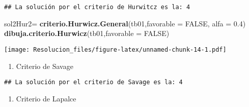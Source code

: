 \documentclass[
]{article}
\newenvironment{Shaded}{\begin{snugshade}}{\end{snugshade}}
\newcommand{\AttributeTok}[1]{\textcolor[rgb]{0.13,0.29,0.53}{#1}}
\newcommand{\ConstantTok}[1]{\textcolor[rgb]{0.56,0.35,0.01}{#1}}
\newcommand{\FloatTok}[1]{\textcolor[rgb]{0.00,0.00,0.81}{#1}}
\newcommand{\FunctionTok}[1]{\textcolor[rgb]{0.13,0.29,0.53}{\textbf{#1}}}
\newcommand{\NormalTok}[1]{#1}
\newcommand{\OtherTok}[1]{\textcolor[rgb]{0.56,0.35,0.01}{#1}}
\newcommand{\SpecialCharTok}[1]{\textcolor[rgb]{0.81,0.36,0.00}{\textbf{#1}}}
\newcommand{\StringTok}[1]{\textcolor[rgb]{0.31,0.60,0.02}{#1}}
\providecommand{\tightlist}{%
  \setlength{\itemsep}{0pt}\setlength{\parskip}{0pt}}
\begin{document}
\begin{verbatim}
## La solución por el criterio de Hurwitcz es la: 4
\end{verbatim}

\begin{Shaded}
\begin{Highlighting}[]
\NormalTok{sol2Hur2}\OtherTok{=} \FunctionTok{criterio.Hurwicz.General}\NormalTok{(tb01,}\AttributeTok{favorable =} \ConstantTok{FALSE}\NormalTok{, }\AttributeTok{alfa =} \FloatTok{0.4}\NormalTok{)}
\FunctionTok{dibuja.criterio.Hurwicz}\NormalTok{(tb01,}\AttributeTok{favorable =} \ConstantTok{FALSE}\NormalTok{)}
\end{Highlighting}
\end{Shaded}

\texttt{[image: Resolucion\_files/figure-latex/unnamed-chunk-14-1.pdf]}

\begin{enumerate}
\def\labelenumi{\arabic{enumi}.}
\setcounter{enumi}{3}
\tightlist
\item
  Criterio de Savage
\end{enumerate}

\begin{Shaded}
\end{Shaded}

\begin{verbatim}
## La solución por el criterio de Savage es la: 4
\end{verbatim}

\begin{enumerate}
\def\labelenumi{\arabic{enumi}.}
\setcounter{enumi}{4}
\tightlist
\item
  Criterio de Lapalce
\end{enumerate}

\begin{Shaded}
\end{Shaded}
\end{document}
